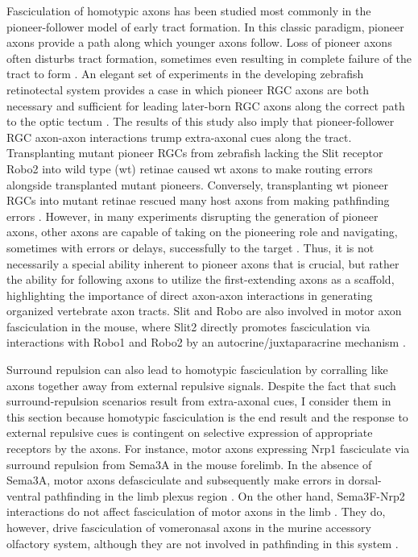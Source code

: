 \label{sec:HomotypicFascic}
Fasciculation of homotypic axons has been studied most commonly in the pioneer-follower model of early tract formation.
In this classic paradigm, pioneer axons provide a path along which younger axons follow.
Loss of pioneer axons often disturbs tract formation, sometimes even resulting in complete failure of the tract to form \cite[reviewed in][]{raper2010cellular}.
An elegant set of experiments in the developing zebrafish retinotectal system provides a case in which pioneer RGC axons are both necessary and sufficient for leading later-born RGC axons along the correct path to the optic tectum \cite{pittman2008pathfinding}.
The results of this study also imply that pioneer-follower RGC axon-axon interactions trump extra-axonal cues along the tract.
Transplanting mutant pioneer RGCs from zebrafish lacking the Slit receptor Robo2 into wild type (wt) retinae caused wt axons to make routing errors alongside transplanted mutant pioneers.
Conversely, transplanting wt pioneer RGCs into mutant retinae rescued many host axons from making pathfinding errors \cite{pittman2008pathfinding}.
However, in many experiments disrupting the generation of pioneer axons, other axons are capable of taking on the pioneering role and navigating, sometimes with errors or delays, successfully to the target \cite[reviewed in][]{raper2010cellular}.
Thus, it is not necessarily a special ability inherent to pioneer axons that is crucial, but rather the ability for following axons to utilize the first-extending axons as a scaffold, highlighting the importance of direct axon-axon interactions in generating organized vertebrate axon tracts.
Slit and Robo are also involved in motor axon fasciculation in the mouse, where Slit2 directly promotes fasciculation via interactions with Robo1 and Robo2 by an autocrine/juxtaparacrine mechanism \cite{jaworski2012autocrine}. 

Surround repulsion can also lead to homotypic fasciculation by corralling like axons together away from external repulsive signals.
Despite the fact that such surround-repulsion scenarios result from extra-axonal cues, I consider them in this section because homotypic fasciculation is the end result and the response to external repulsive cues is contingent on selective expression of appropriate receptors by the axons.
For instance, motor axons expressing Nrp1 fasciculate via surround repulsion from Sema3A in the mouse forelimb.
In the absence of Sema3A, motor axons defasciculate and subsequently make errors in dorsal-ventral pathfinding in the limb plexus region \cite{huber2005distinct}.
On the other hand, Sema3F-Nrp2 interactions do not affect fasciculation of motor axons in the limb \cite{huber2005distinct}.
They do, however, drive fasciculation of vomeronasal axons in the murine accessory olfactory system, although they are not involved in pathfinding in this system \cite{cloutier2002neuropilin}.

